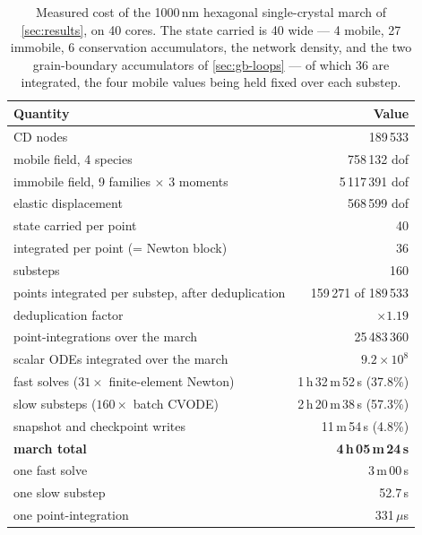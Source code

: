 \begin{table}[htbp]
\caption{Measured cost of the 1000\,nm hexagonal single-crystal march of
\cref{sec:results}, on 40 cores. The state carried is 40 wide --- 4 mobile,
27 immobile, 6 conservation accumulators, the network density, and the two
grain-boundary accumulators of \cref{sec:gb-loops} --- of which 36 are
integrated, the four mobile values being held fixed over each substep.}
\label{tab:cost}
\centering\small
\begin{tabular}{@{}lr@{}}
\toprule
Quantity & Value \\
\midrule
CD nodes & 189\,533 \\
mobile field, 4 species & 758\,132 dof \\
immobile field, 9 families $\times$ 3 moments & 5\,117\,391 dof \\
elastic displacement & 568\,599 dof \\
\midrule
state carried per point & 40 \\
integrated per point (= Newton block) & 36 \\
substeps & 160 \\
points integrated per substep, after deduplication & 159\,271 of 189\,533 \\
deduplication factor & $\times1.19$ \\
point-integrations over the march & 25\,483\,360 \\
scalar ODEs integrated over the march & $9.2\times10^{8}$ \\
\midrule
fast solves ($31\times$ finite-element Newton) & 1\,h\,32\,m\,52\,s \quad(37.8\%) \\
slow substeps ($160\times$ batch CVODE) & 2\,h\,20\,m\,38\,s \quad(57.3\%) \\
snapshot and checkpoint writes & 11\,m\,54\,s \quad(4.8\%) \\
\textbf{march total} & \textbf{4\,h\,05\,m\,24\,s} \\
\midrule
one fast solve & 3\,m\,00\,s \\
one slow substep & 52.7\,s \\
one point-integration & 331\,$\mu$s \\
\bottomrule
\end{tabular}
\end{table}

